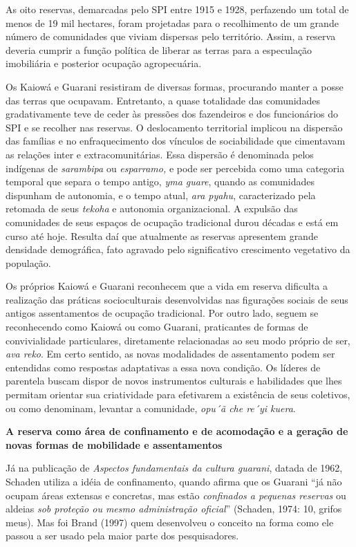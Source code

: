As oito reservas, demarcadas pelo SPI entre 1915 e 1928, perfazendo um
total de menos de 19 mil hectares, foram projetadas para o recolhimento
de um grande número de comunidades que viviam dispersas pelo território.
Assim, a reserva deveria cumprir a função política de liberar as terras
para a especulação imobiliária e posterior ocupação agropecuária.

Os Kaiowá e Guarani resistiram de diversas formas, procurando manter a
posse das terras que ocupavam. Entretanto, a quase totalidade das
comunidades gradativamente teve de ceder às pressões dos fazendeiros e
dos funcionários do SPI e se recolher nas reservas. O deslocamento
territorial implicou na dispersão das famílias e no enfraquecimento dos
vínculos de sociabilidade que cimentavam as relações inter e
extracomunitárias. Essa dispersão é denominada pelos indígenas de
\emph{sarambipa} ou \emph{esparramo,} e pode ser percebida como uma
categoria temporal que separa o tempo antigo, \emph{yma guare}, quando
as comunidades dispunham de autonomia, e o tempo atual, \emph{ara
pyahu}, caracterizado pela retomada de seus \emph{tekoha} e autonomia
organizacional. A expulsão das comunidades de seus espaços de ocupação
tradicional durou décadas e está em curso até hoje. Resulta daí que
atualmente as reservas apresentem grande densidade demográfica, fato
agravado pelo significativo crescimento vegetativo da população.

Os próprios Kaiowá e Guarani reconhecem que a vida em reserva dificulta
a realização das práticas socioculturais desenvolvidas nas figurações
sociais de seus antigos assentamentos de ocupação tradicional. Por outro
lado, seguem se reconhecendo como Kaiowá ou como Guarani, praticantes de
formas de convivialidade particulares, diretamente relacionadas ao seu
modo próprio de ser, \emph{ava reko}. Em certo sentido, as novas
modalidades de assentamento podem ser entendidas como respostas
adaptativas a essa nova condição. Os líderes de parentela buscam dispor
de novos instrumentos culturais e habilidades que lhes permitam orientar
sua criatividade para efetivarem a existência de seus coletivos, ou como
denominam, levantar a comunidade, \emph{opu´ã che re´yi kuera}.

\textbf{A reserva como área de confinamento e de acomodação e a geração
de novas formas de mobilidade e assentamentos}

Já na publicação de \emph{Aspectos fundamentais da cultura guarani},
datada de 1962, Schaden utiliza a idéia de confinamento, quando afirma
que os Guarani ``já não ocupam áreas extensas e concretas, mas estão
\emph{confinados a pequenas reservas} ou aldeias \emph{sob proteção ou
mesmo administração oficial}'' (Schaden, 1974: 10, grifos meus). Mas foi
Brand (1997) quem desenvolveu o conceito na forma como ele passou a ser
usado pela maior parte dos pesquisadores.

